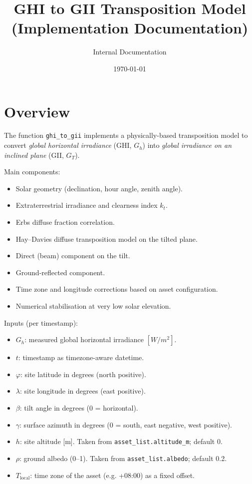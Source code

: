 \documentclass[11pt,a4paper]{article}
\title{GHI to GII Transposition Model\\(Implementation Documentation)}
\author{Internal Documentation}
\date{\today}
\begin{document}
\maketitle

\section{Overview}

The function \texttt{ghi\_to\_gii} implements a physically-based transposition model to convert
\emph{global horizontal irradiance} (GHI, \(G_h\)) into \emph{global irradiance on an inclined plane} (GII, \(G_T\)).

Main components:
\begin{itemize}
  \item Solar geometry (declination, hour angle, zenith angle).
  \item Extraterrestrial irradiance and clearness index \(k_t\).
  \item Erbs diffuse fraction correlation.
  \item Hay--Davies diffuse transposition model on the tilted plane.
  \item Direct (beam) component on the tilt.
  \item Ground-reflected component.
  \item Time zone and longitude corrections based on asset configuration.
  \item Numerical stabilisation at very low solar elevation.
\end{itemize}

Inputs (per timestamp):
\begin{itemize}
  \item \(G_h\): measured global horizontal irradiance \([\si{W/m^2}]\).
  \item \(t\): timestamp as timezone-aware datetime.
  \item \(\varphi\): site latitude in degrees (north positive).
  \item \(\lambda\): site longitude in degrees (east positive).
  \item \(\beta\): tilt angle in degrees (0 = horizontal).
  \item \(\gamma\): surface azimuth in degrees (0 = south, east negative, west positive).
  \item \(h\): site altitude [m]. Taken from \texttt{asset\_list.altitude\_m}; default 0.
  \item \(\rho\): ground albedo (0--1). Taken from \texttt{asset\_list.albedo}; default 0.2.
  \item \(T_{\text{local}}\): time zone of the asset (e.g. +08:00) as a fixed offset.
\end{itemize}
\end{document}
